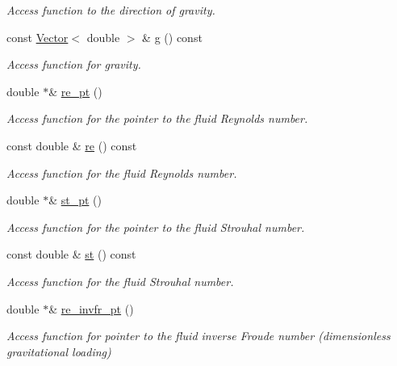 \begin{DoxyCompactItemize}
\begin{DoxyCompactList}\small\item\em Access function to the direction of gravity. \end{DoxyCompactList}\item 
const \hyperlink{classoomph_1_1Vector}{Vector}$<$ double $>$ \& \hyperlink{classoomph_1_1ImmersedRigidBodyElement_a01354ab471561d2703f8d391ae63f224}{g} () const
\begin{DoxyCompactList}\small\item\em Access function for gravity. \end{DoxyCompactList}\item 
double $\ast$\& \hyperlink{classoomph_1_1ImmersedRigidBodyElement_a7e8d88cc4b96a47fbe48a627ec9204c9}{re\+\_\+pt} ()
\begin{DoxyCompactList}\small\item\em Access function for the pointer to the fluid Reynolds number. \end{DoxyCompactList}\item 
const double \& \hyperlink{classoomph_1_1ImmersedRigidBodyElement_ab1dd410be282f26775715bc14544723f}{re} () const
\begin{DoxyCompactList}\small\item\em Access function for the fluid Reynolds number. \end{DoxyCompactList}\item 
double $\ast$\& \hyperlink{classoomph_1_1ImmersedRigidBodyElement_a2f57a2105a0bb176daaa634b100801fa}{st\+\_\+pt} ()
\begin{DoxyCompactList}\small\item\em Access function for the pointer to the fluid Strouhal number. \end{DoxyCompactList}\item 
const double \& \hyperlink{classoomph_1_1ImmersedRigidBodyElement_a872d911b5a42dae2b2d1463a9a381bb2}{st} () const
\begin{DoxyCompactList}\small\item\em Access function for the fluid Strouhal number. \end{DoxyCompactList}\item 
double $\ast$\& \hyperlink{classoomph_1_1ImmersedRigidBodyElement_ad31c52b0920a18e69a71577ad5aad277}{re\+\_\+invfr\+\_\+pt} ()
\begin{DoxyCompactList}\small\item\em Access function for pointer to the fluid inverse Froude number (dimensionless gravitational loading) \end{DoxyCompactList}\item 

\end{DoxyCompactItemize}
